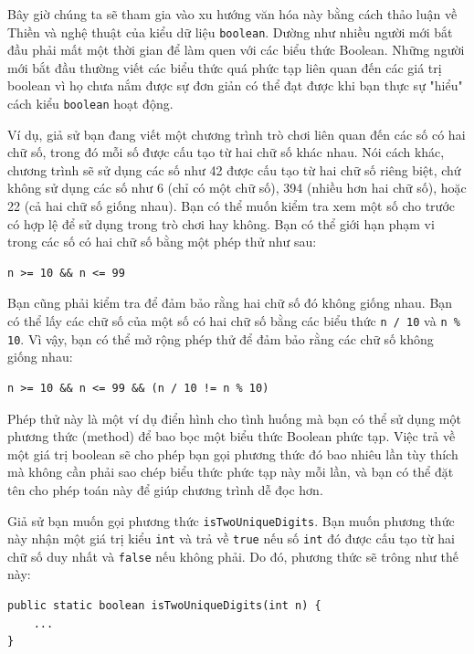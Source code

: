 Bây giờ chúng ta sẽ tham gia vào xu hướng văn hóa này bằng cách thảo luận về Thiền và nghệ thuật của kiểu dữ liệu \texttt{boolean}. Dường như nhiều người mới bắt đầu phải mất một thời gian để làm quen với các biểu thức Boolean. Những người mới bắt đầu thường viết các biểu thức quá phức tạp liên quan đến các giá trị boolean vì họ chưa nắm được sự đơn giản có thể đạt được khi bạn thực sự "hiểu" cách kiểu \texttt{boolean} hoạt động.

Ví dụ, giả sử bạn đang viết một chương trình trò chơi liên quan đến các số có hai chữ số, trong đó mỗi số được cấu tạo từ hai chữ số khác nhau. Nói cách khác, chương trình sẽ sử dụng các số như 42 được cấu tạo từ hai chữ số riêng biệt, chứ không sử dụng các số như 6 (chỉ có một chữ số), 394 (nhiều hơn hai chữ số), hoặc 22 (cả hai chữ số giống nhau). Bạn có thể muốn kiểm tra xem một số cho trước có hợp lệ để sử dụng trong trò chơi hay không. Bạn có thể giới hạn phạm vi trong các số có hai chữ số bằng một phép thử như sau:

\begin{verbatim}
n >= 10 && n <= 99
\end{verbatim}

Bạn cũng phải kiểm tra để đảm bảo rằng hai chữ số đó không giống nhau. Bạn có thể lấy các chữ số của một số có hai chữ số bằng các biểu thức \texttt{n / 10} và \texttt{n \% 10}. Vì vậy, bạn có thể mở rộng phép thử để đảm bảo rằng các chữ số không giống nhau:

\begin{verbatim}
n >= 10 && n <= 99 && (n / 10 != n % 10)
\end{verbatim}

Phép thử này là một ví dụ điển hình cho tình huống mà bạn có thể sử dụng một phương thức (method) để bao bọc một biểu thức Boolean phức tạp. Việc trả về một giá trị boolean sẽ cho phép bạn gọi phương thức đó bao nhiêu lần tùy thích mà không cần phải sao chép biểu thức phức tạp này mỗi lần, và bạn có thể đặt tên cho phép toán này để giúp chương trình dễ đọc hơn.

Giả sử bạn muốn gọi phương thức \texttt{isTwoUniqueDigits}. Bạn muốn phương thức này nhận một giá trị kiểu \texttt{int} và trả về \texttt{true} nếu số \texttt{int} đó được cấu tạo từ hai chữ số duy nhất và \texttt{false} nếu không phải. Do đó, phương thức sẽ trông như thế này:

\begin{verbatim}
public static boolean isTwoUniqueDigits(int n) {
    ...
}
\end{verbatim}

